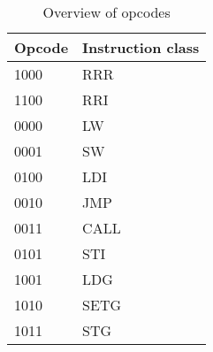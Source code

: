 \begin{table}[h]
    \centering
    \begin{tabular}{| l | l |}
    \hline
    Opcode & Instruction class \\
    \hline
    1000   & RRR               \\
    1100   & RRI               \\
    0000   & LW                \\
    0001   & SW                \\
    0100   & LDI               \\
    0010   & JMP               \\
    0011   & CALL              \\
    0101   & STI               \\
    1001   & LDG               \\
    1010   & SETG              \\
    1011   & STG               \\
    \hline       
    
    \end{tabular}
    \caption{Overview of opcodes}
    \label{fpga:tbl:opcode_tbl}

\end{table}
